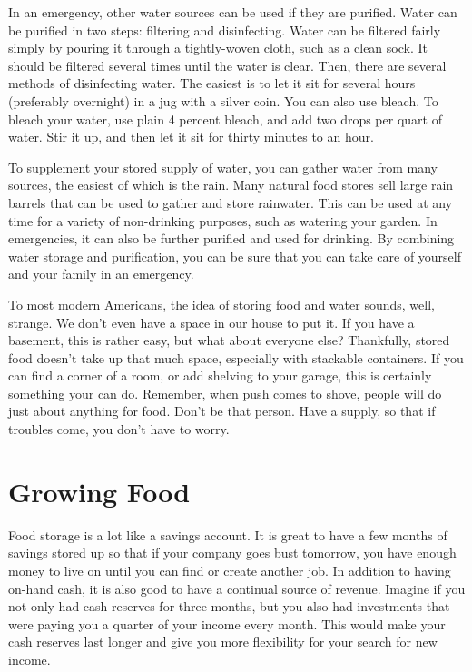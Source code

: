 In an emergency, other water sources can be used if they are purified.
Water can be purified in two steps: filtering and disinfecting. Water
can be filtered fairly simply by pouring it through a tightly-woven
cloth, such as a clean sock. It should be filtered several times until
the water is clear. Then, there are several methods of disinfecting
water. The easiest is to let it sit for several hours (preferably
overnight) in a jug with a silver coin. You can also use bleach. To
bleach your water, use plain 4 percent bleach, and add two drops per
quart of water. Stir it up, and then let it sit for thirty minutes to
an hour. 

To supplement your stored supply of water, you can gather water from
many sources, the easiest of which is the rain. Many natural food
stores sell large rain barrels that can be used to gather and store
rainwater. This can be used at any time for a variety of non-drinking
purposes, such as watering your garden.  In emergencies, it can also be
further purified and used for drinking. By combining water storage and
purification, you can be sure that you can take care of yourself and
your family in an emergency. 

To most modern Americans, the idea of storing food and water sounds,
well, strange.  We don't even have a space in our
house to put it.  If you have a basement, this is rather easy, but what
about everyone else?  Thankfully, stored food doesn't
take up that much space, especially with stackable containers.  If you
can find a corner of a room, or add shelving to your garage, this is
certainly something your can do.  Remember, when push comes to shove,
people will do just about anything for food.  Don't be
that person.  Have a supply, so that if troubles come, you
don't have to worry.

\section{Growing Food}

Food storage is a lot like a savings account. It is great to have a few
months of savings stored up so that if your company goes bust tomorrow,
you have enough money to live on until you can find or create another
job. In addition to having on-hand cash, it is also good to have a
continual source of revenue. Imagine if you not only had cash reserves
for three months, but you also had investments that were paying you a
quarter of your income every month. This would make your cash reserves
last longer and give you more flexibility for your search for new
income.

